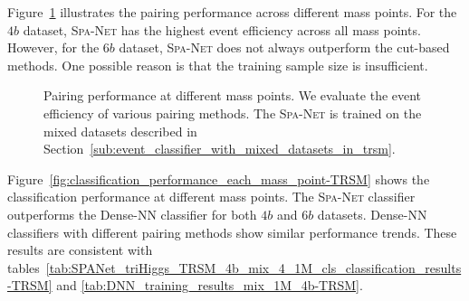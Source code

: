 \documentclass[12pt]{article}
\begin{document}
        Figure~\ref{fig:pairing_performance_each_mass_point-TRSM} illustrates the pairing performance across different mass points. For the $4b$ dataset, \textsc{Spa-Net} has the highest event efficiency across all mass points. However, for the $6b$ dataset, \textsc{Spa-Net} does not always outperform the cut-based methods. One possible reason is that the training sample size is insufficient.
        \begin{figure}[htpb]
            \centering
            \caption{Pairing performance at different mass points. We evaluate the event efficiency of various pairing methods. The \textsc{Spa-Net} is trained on the mixed datasets described in Section~\ref{sub:event_classifier_with_mixed_datasets_in_trsm}.}  
            \label{fig:pairing_performance_each_mass_point-TRSM}  
        \end{figure}

        Figure~\ref{fig:classification_performance_each_mass_point-TRSM} shows the classification performance at different mass points. The \textsc{Spa-Net} classifier outperforms the Dense-NN classifier for both $4b$ and $6b$ datasets. Dense-NN classifiers with different pairing methods show similar performance trends. These results are consistent with tables~\ref{tab:SPANet_triHiggs_TRSM_4b_mix_4_1M_cls_classification_results-TRSM} and \ref{tab:DNN_training_results_mix_1M_4b-TRSM}.  
\end{document}

